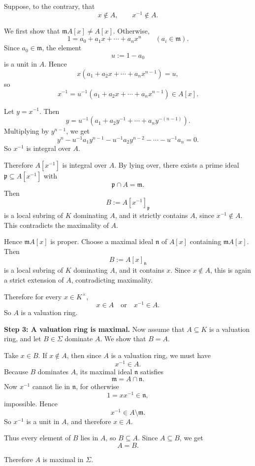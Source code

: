 \documentclass[12pt,a4paper,oneside]{report}
\theoremstyle{notespace}
\begin{document}
Suppose, to the contrary, that
\[
x\notin A,\qquad x^{-1}\notin A.
\]

We first show that \(\mathfrak m A[x]\neq A[x]\). Otherwise,
\[
1=a_0+a_1x+\cdots+a_nx^n
\qquad (a_i\in \mathfrak m).
\]
Since \(a_0\in \mathfrak m\), the element
\[
u:=1-a_0
\]
is a unit in \(A\). Hence
\[
x(a_1+a_2x+\cdots+a_nx^{n-1})=u,
\]
so
\[
x^{-1}=u^{-1}(a_1+a_2x+\cdots+a_nx^{n-1})\in A[x].
\]

Let \(y=x^{-1}\). Then
\[
y=u^{-1}(a_1+a_2y^{-1}+\cdots+a_n y^{-(n-1)}).
\]
Multiplying by \(y^{n-1}\), we get
\[
y^n-u^{-1}a_1y^{n-1}-u^{-1}a_2y^{n-2}-\cdots-u^{-1}a_n=0.
\]
So \(x^{-1}\) is integral over \(A\).

Therefore \(A[x^{-1}]\) is integral over \(A\). By lying over, there exists a prime ideal \(\mathfrak p\subseteq A[x^{-1}]\) with
\[
\mathfrak p\cap A=\mathfrak m.
\]
Then
\[
B:=A[x^{-1}]_{\mathfrak p}
\]
is a local subring of \(K\) dominating \(A\), and it strictly contains \(A\), since \(x^{-1}\notin A\). This contradicts the maximality of \(A\).

Hence \(\mathfrak m A[x]\) is proper. Choose a maximal ideal \(\mathfrak n\) of \(A[x]\) containing \(\mathfrak m A[x]\). Then
\[
B:=A[x]_{\mathfrak n}
\]
is a local subring of \(K\) dominating \(A\), and it contains \(x\). Since \(x\notin A\), this is again a strict extension of \(A\), contradicting maximality.

Therefore for every \(x\in K^\times\),
\[
x\in A \quad\text{or}\quad x^{-1}\in A.
\]
So \(A\) is a valuation ring.

\medskip

\textbf{Step 3: A valuation ring is maximal.}
Now assume that \(A\subseteq K\) is a valuation ring, and let \(B\in\Sigma\) dominate \(A\). We show that \(B=A\).

Take \(x\in B\). If \(x\notin A\), then since \(A\) is a valuation ring, we must have
\[
x^{-1}\in A.
\]
Because \(B\) dominates \(A\), its maximal ideal \(\mathfrak n\) satisfies
\[
\mathfrak m=A\cap \mathfrak n.
\]
Now \(x^{-1}\) cannot lie in \(\mathfrak n\), for otherwise
\[
1=xx^{-1}\in \mathfrak n,
\]
impossible. Hence
\[
x^{-1}\in A\setminus \mathfrak m.
\]
So \(x^{-1}\) is a unit in \(A\), and therefore \(x\in A\).

Thus every element of \(B\) lies in \(A\), so \(B\subseteq A\). Since \(A\subseteq B\), we get
\[
A=B.
\]

Therefore \(A\) is maximal in \(\Sigma\).

\medskip
\end{document}
